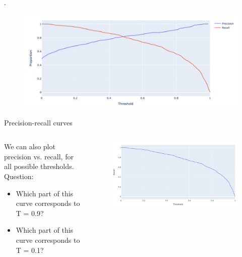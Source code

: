\documentclass[aspectratio=169]{../latex_main/tntbeamer}  %
\begin{document}
	
	\begin{frame}{.}
	    \begin{figure}
	        \centering
	        \includegraphics[scale=.6]{Bild22}
	    \end{figure}
	\end{frame}
	
	
	
	\begin{frame}{Precision-recall curves}
	    \begin{columns}
	        \begin{column}{.5\textwidth}
	        We can also plot precision vs. recall, for all possible thresholds.\\
	        \bigskip
	        Question: 
	             \begin{itemize}
	                 \item Which part of this curve corresponds to T = 0.9?
	                 \item Which part of this curve corresponds to T = 0.1?
	             \end{itemize} 
	        \end{column}
	        
	        
	        \begin{column}{.5\textwidth}
	                \begin{figure}
	                    \centering
	                    \includegraphics[scale=.6]{Bild21}
	                \end{figure}
	                
	                
	        \end{column}
	        
	    \end{columns}
	\end{frame}
	
\end{document}
